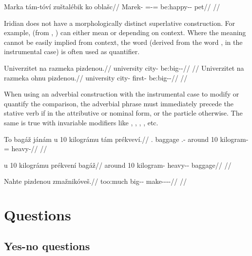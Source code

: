 \ex
\begingl
\gla Marka tám-tóví zuštalébik ko oblašc//
\glb Marek-\Acc{} \Comp{}=\Rz{}-\Gen{}= be:happy-\Ben{}-\Pf{} \Lnk{} pet//
\glft {}//
\endgl
\xe

Iridian does not have a morphologically distinct superlative construction. For
example,  (from , ) can either mean
 or  depending on context. Where the meaning cannot
be easily implied from context, the word  (derived from the word
,  in the instrumental case) is often used as quantifier.

\pex
\a
\begingl
\gla Univerzitet na razmeka pizdenou.//
\glb university \Loc{} city-\Acc{} be:big-\Comp{}-\Nz{}//
\glft {}//
\endgl
\a
\begingl
\gla Univerzitet na razmeka ohnu pizdenou.//
\glb university \Loc{} city-\Acc{} first-\Ins{} be:big-\Comp{}-\Nz{}//
\glft {}//
\endgl
\xe

When using an adverbial construction with the instrumental case to modify or
quantify the comparison, the adverbial phrase must immediately precede the
stative verb if in the attributive or nominal form, or the particle 
otherwise. The same is true with invariable modifiers like ,
, , , etc.

\ex
\begingl
\gla To bagáž jánám u 10 kilográmu tám prékveví.//
\glb \Dem{}.\Prox{} baggage \Dem{}.\Med{}-\Agt{} around 10 kilogram-\Ins{} \Comp{}= heavy-\Cont{}//
\glft {}//
\endgl
\xe

\ex
\begingl
\gla u 10 kilográmu prékvení bagáž//
\glb around 10 kilogram-\Ins{} heavy-\Comp{}-\Att{} baggage//
\glft {}//
\endgl
\xe

\ex
\begingl
\gla Nahte pizdenou zmažnikóveš.//
\glb too:much big-\Comp{}-\Nz{} make-\Pv{}-\Pf{}-\Nz{}-\Second{}\Sg{}//
\glft {}//
\endgl
\xe

\section{Questions}\label{sec:questions-syntax}

\subsection{Yes-no questions}\label{sec:questions-yesno}

